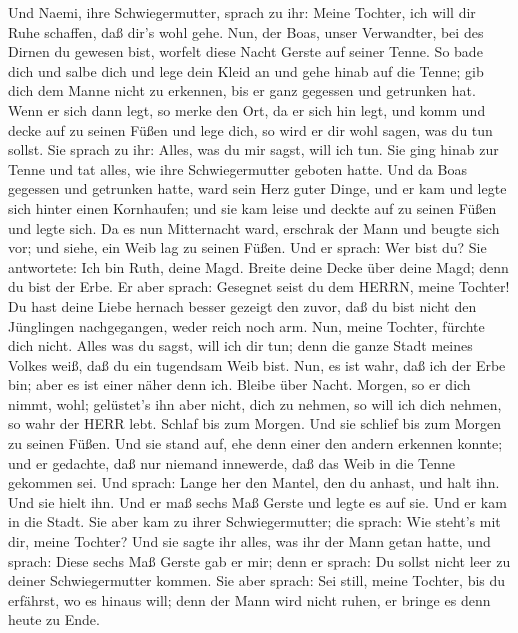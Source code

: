  Und Naemi, ihre Schwiegermutter, sprach zu ihr: Meine
Tochter, ich will dir Ruhe schaffen, daß dir's wohl gehe. 
Nun, der Boas, unser Verwandter, bei des Dirnen du gewesen bist, worfelt
diese Nacht Gerste auf seiner Tenne.  So bade dich und salbe
dich und lege dein Kleid an und gehe hinab auf die Tenne; gib dich dem
Manne nicht zu erkennen, bis er ganz gegessen und getrunken hat.
 Wenn er sich dann legt, so merke den Ort, da er sich hin
legt, und komm und decke auf zu seinen Füßen und lege dich, so wird er
dir wohl sagen, was du tun sollst.  Sie sprach zu ihr:
Alles, was du mir sagst, will ich tun.  Sie ging hinab zur
Tenne und tat alles, wie ihre Schwiegermutter geboten hatte.
 Und da Boas gegessen und getrunken hatte, ward sein Herz
guter Dinge, und er kam und legte sich hinter einen Kornhaufen; und sie
kam leise und deckte auf zu seinen Füßen und legte sich.  Da
es nun Mitternacht ward, erschrak der Mann und beugte sich vor; und
siehe, ein Weib lag zu seinen Füßen.  Und er sprach: Wer
bist du? Sie antwortete: Ich bin Ruth, deine Magd. Breite deine Decke
über deine Magd; denn du bist der Erbe.  Er aber sprach:
Gesegnet seist du dem HERRN, meine Tochter! Du hast deine Liebe hernach
besser gezeigt den zuvor, daß du bist nicht den Jünglingen nachgegangen,
weder reich noch arm.  Nun, meine Tochter, fürchte dich
nicht. Alles was du sagst, will ich dir tun; denn die ganze Stadt meines
Volkes weiß, daß du ein tugendsam Weib bist.  Nun, es ist
wahr, daß ich der Erbe bin; aber es ist einer näher denn ich.
 Bleibe über Nacht. Morgen, so er dich nimmt, wohl;
gelüstet's ihn aber nicht, dich zu nehmen, so will ich dich nehmen, so
wahr der HERR lebt. Schlaf bis zum Morgen.  Und sie schlief
bis zum Morgen zu seinen Füßen. Und sie stand auf, ehe denn einer den
andern erkennen konnte; und er gedachte, daß nur niemand innewerde, daß
das Weib in die Tenne gekommen sei.  Und sprach: Lange her
den Mantel, den du anhast, und halt ihn. Und sie hielt ihn. Und er maß
sechs Maß Gerste und legte es auf sie. Und er kam in die Stadt.
 Sie aber kam zu ihrer Schwiegermutter; die sprach: Wie
steht's mit dir, meine Tochter? Und sie sagte ihr alles, was ihr der
Mann getan hatte,  und sprach: Diese sechs Maß Gerste gab
er mir; denn er sprach: Du sollst nicht leer zu deiner Schwiegermutter
kommen.  Sie aber sprach: Sei still, meine Tochter, bis du
erfährst, wo es hinaus will; denn der Mann wird nicht ruhen, er bringe
es denn heute zu Ende.


